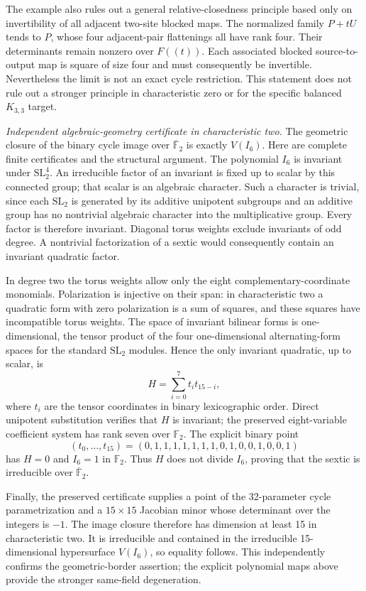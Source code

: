 The example also rules out a general relative-closedness
principle based only on invertibility of all adjacent
two-site blocked maps. The normalized family $P+tU$ tends
to $P$, whose four adjacent-pair flattenings all have rank
four. Their determinants remain nonzero over $F((t))$.
Each associated blocked source-to-output map is square of
size four and must consequently be invertible. Nevertheless
the limit is not an exact cycle restriction. This statement
does not rule out a stronger principle in characteristic
zero or for the specific balanced $K_{3,3}$ target.

\emph{Independent algebraic-geometry certificate in characteristic two.}
The geometric closure of the binary cycle image over
$\overline{\mathbb F}_2$ is exactly $V(I_6)$. Here are
complete finite certificates and the structural argument.
The polynomial $I_6$ is invariant under $\mathrm{SL}_2^4$.
An irreducible factor of an invariant is fixed up to scalar
by this connected group; that scalar is an algebraic
character. Such a character is trivial, since each
$\mathrm{SL}_2$ is generated by its additive unipotent
subgroups and an additive group has no nontrivial
algebraic character into the multiplicative group.
Every factor is therefore invariant. Diagonal torus weights
exclude invariants of odd degree. A nontrivial factorization
of a sextic would consequently contain an invariant
quadratic factor.

In degree two the torus weights allow only the eight
complementary-coordinate monomials. Polarization is
injective on their span: in characteristic two a quadratic
form with zero polarization is a sum of squares, and these
squares have incompatible torus weights. The space of
invariant bilinear forms is one-dimensional, the tensor
product of the four one-dimensional alternating-form
spaces for the standard $\mathrm{SL}_2$ modules. Hence
the only invariant quadratic, up to scalar, is
\[
 H=\sum_{i=0}^7 t_i t_{15-i},
\]
where $t_i$ are the tensor coordinates in binary
lexicographic order. Direct unipotent substitution verifies
that $H$ is invariant; the preserved eight-variable
coefficient system has rank seven over $\mathbb F_2$.
The explicit binary point
\[
 (t_0,\ldots,t_{15})
 =(0,1,1,1,1,1,1,1,0,1,0,0,1,0,0,1)
\]
has $H=0$ and $I_6=1$ in $\mathbb F_2$. Thus $H$ does
not divide $I_6$, proving that the sextic is irreducible
over $\overline{\mathbb F}_2$.

Finally, the preserved certificate supplies a point of the
32-parameter cycle parametrization and a $15\times15$
Jacobian minor whose determinant over the integers is
$-1$. The image closure therefore has dimension at least
15 in characteristic two. It is irreducible and contained
in the irreducible 15-dimensional hypersurface $V(I_6)$,
so equality follows. This independently confirms the
geometric-border assertion; the explicit polynomial maps
above provide the stronger same-field degeneration.

